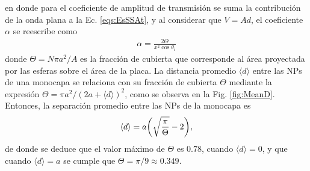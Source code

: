 \noindent en donde para el coeficiente de amplitud de transmisión se suma la contribución de la onda plana a la Ec. \eqref{eqs:EsSSAt}, y al considerar que $V = A d$, el coeficiente $\alpha$ se reescribe como
	\begin{align}
	\alpha = \frac{2\Theta}{x^2 \cos\theta_i}
	\label{eq:alpha}
	\end{align}
donde $\Theta = N \pi a^2 / A$ es la fracción de cubierta que corresponde al área proyectada por las esferas sobre el área de la placa. La distancia promedio $\langle d \rangle$ entre las NPs de una monocapa se relaciona con su fracción de cubierta $\Theta$ mediante la expresión $\Theta = \pi a^2 / (2a+\langle d \rangle)^2$, como se observa en la Fig. \ref{fig:MeanD}. Entonces, la separación promedio entre las NPs de la monocapa es
	\begin{equation}
	\langle d \rangle = a\qty(\sqrt{\frac{\pi}{\Theta}}-2),
	\label{eq:MeanD}
	\end{equation}
de donde se deduce que el valor máximo de $\Theta$ es $0.78$, cuando $\langle d\rangle=0$, y que cuando $\langle d \rangle = a$ se cumple que $\Theta = \pi/9\approx 0.349$.

